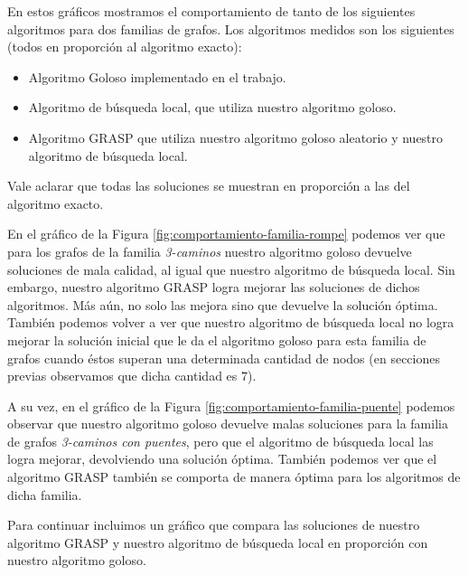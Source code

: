 En estos gráficos mostramos el comportamiento de tanto de los siguientes algoritmos para dos familias de grafos. Los algoritmos medidos son los siguientes (todos en proporción al algoritmo exacto):

\begin{itemize}
 \item Algoritmo Goloso implementado en el trabajo.
 \item Algoritmo de búsqueda local, que utiliza nuestro algoritmo goloso.
 \item Algoritmo GRASP que utiliza nuestro algoritmo goloso aleatorio y nuestro algoritmo de búsqueda local.
\end{itemize}

Vale aclarar que todas las soluciones se muestran en proporción a las del algoritmo exacto.

En el gráfico de la Figura \ref{fig:comportamiento-familia-rompe} podemos ver que para los grafos de la familia \emph{3-caminos} nuestro algoritmo goloso devuelve soluciones de mala calidad, al igual que nuestro algoritmo de búsqueda local. Sin embargo, nuestro algoritmo GRASP logra mejorar las soluciones de dichos algoritmos. Más aún, no solo las mejora sino que devuelve la solución óptima. También podemos volver a ver que nuestro algoritmo de búsqueda local no logra mejorar la solución inicial que le da el algoritmo goloso para esta familia de grafos cuando éstos superan una determinada cantidad de nodos (en secciones previas observamos que dicha cantidad es $7$).

A su vez, en el gráfico de la Figura \ref{fig:comportamiento-familia-puente} podemos observar que nuestro algoritmo goloso devuelve malas soluciones para la familia de grafos \emph{3-caminos con puentes}, pero que el algoritmo de búsqueda local las logra mejorar, devolviendo una solución óptima. También podemos ver que el algoritmo GRASP también se comporta de manera óptima para los algoritmos de dicha familia.

Para continuar incluimos un gráfico que compara las soluciones de nuestro algoritmo GRASP y nuestro algoritmo de búsqueda local en proporción con nuestro algoritmo goloso.

